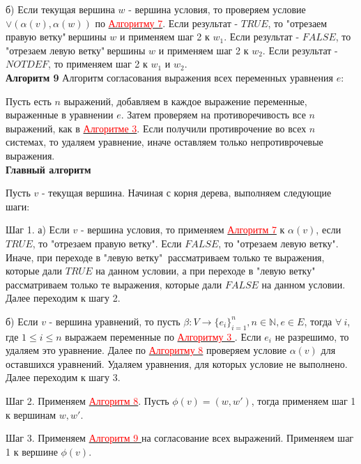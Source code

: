 \documentclass[12pt]{article}
\begin{document}
        б) Если текущая вершина $w$ - вершина условия, то проверяем условие $\vee(\alpha(v),\alpha(w))$ по \hyperlink{a7}{ \textcolor{red}{Алгоритму 7}}. Если результат - $TRUE$, то "отрезаем правую ветку"$\:$вершины $w$ и применяем шаг 2 к $w_{1}$. Если результат - $FALSE$, то "отрезаем левую ветку"$\:$вершины $w$ и применяем шаг 2 к $w_{2}$. Если результат - $NOTDEF$, то применяем шаг 2 к $w_{1}$ и $w_{2}$.
      \\
      
      \hypertarget{a9}{{\bf Алгоритм 9}} Алгоритм согласования выражения всех переменных уравнения $e$:
      
      Пусть есть $n$ выражений, добавляем в каждое выражение переменные, выраженные в уравнении $e$. Затем проверяем на противоречивость все $n$ выражений, как в  \hyperlink{a3}{ \textcolor{red}{Алгоритме 3}}. Если получили противрочение во всех $n$ системах, то удаляем уравнение, иначе оставляем только непротиврочевые выражения.
      \\
      
     {\bf Главный  алгоритм} 
     
     Пусть $v$ - текущая вершина.
     Начиная с корня дерева, выполняем следующие шаги:
     
     Шаг 1. а) Если $v$ - вершина условия, то применяем  \hyperlink{a7}{ \textcolor{red}{Алгоритм 7}} к  $\alpha(v)$, если $TRUE$, то "отрезаем правую ветку".  Если $FALSE$, то "отрезаем левую ветку". Иначе, при переходе в "левую ветку"$\:$ рассматриваем только те выражения, которые дали $TRUE$ на данном условии, а при переходе в "левую ветку"$\:$ рассматриваем только те выражения, которые дали $FALSE$ на данном условии. Далее переходим к шагу 2.
     
     б) Если $v$ - вершина уравнений, то пусть $\beta : V \rightarrow \lbrace  e_{i}  \rbrace_{i=1}^{n}, n \in \mathbb{N}, e \in E$, тогда $\forall \: i$, где $ 1 \leq i \leq n$ выражаем переменные по \hyperlink{a3}{ \textcolor{red}{Алгоритму 3 }}. Если $e_{i} $ не разрешимо, то удаляем это уравнение. Далее по \hyperlink{a8}{ \textcolor{red}{Алгоритму 8}} проверяем условие $\alpha(v)$ для оставшихся уравнений. Удаляем уравнения, для которых условие не выполнено. Далее переходим к шагу 3.
          
     Шаг 2. Применяем  \hyperlink{a8}{ \textcolor{red}{Алгоритм 8}}. Пусть $\phi(v)=(w,w')$, тогда применяем шаг 1 к вершинам $w, w'$.
     
     Шаг 3. Применяем  \hyperlink{a9}{ \textcolor{red}{Алгоритм 9 }} на согласование  всех выражений. Применяем шаг 1 к вершине $\phi(v)$.
     
     
     
     
     
\end{document}
